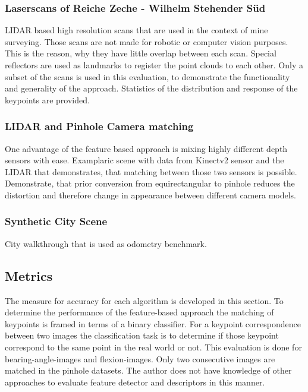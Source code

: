 \subsubsection{Laserscans of Reiche Zeche - Wilhelm Stehender Süd}

LIDAR based high resolution scans that are used in the context of mine surveying.
Those scans are not made for robotic or computer vision purposes.
This is the reason, why they have little overlap between each scan.
Special reflectors are used as landmarks to register the point clouds to each other.
Only a subset of the scans is used in this evaluation, to demonstrate the functionality and generality of the approach.
Statistics of the distribution and response of the keypoints are provided.

\subsubsection{LIDAR and Pinhole Camera matching}

One advantage of the feature based approach is mixing highly different depth sensors with ease.
Examplaric scene with data from Kinectv2 sensor and the LIDAR that demonstrates, that matching between those two sensors is possible.
Demonstrate, that prior conversion from equirectangular to pinhole reduces the distortion and therefore change in appearance between different camera models.


\subsubsection{Synthetic City Scene}

City walkthrough that is used as odometry benchmark.

\subsection{Metrics}

The measure for accuracy for each algorithm is developed in this section.
To determine the performance of the feature-based approach the matching of keypoints is framed in terms of a binary classifier.
For a keypoint correspondence between two images the classification task is to determine if those keypoint correspond to the same point in the real world or not.
This evaluation is done for \Glspl{bearing-angle-image} and \Glspl{flexion-image}.
Only two consecutive images are matched in the pinhole datasets. 
The author does not have knowledge of other approaches to evaluate feature detector and descriptors in this manner.

